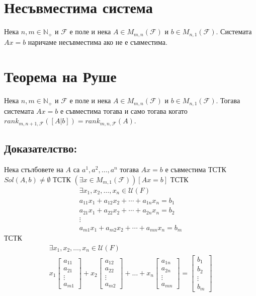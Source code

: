 \documentclass[a4paper,9pt]{extarticle}
\newcommand{\Nat}{\mathbb{N}}
\newcommand{\F}{\mathcal{F}}
\newcommand{\Uni}{\mathcal{U}}
\begin{document}
\section{Несъвместима система}
Нека \(n, m \in \Nat_+\) и \(\F\) е поле и нека \(A \in M_{m, n}(\F)\) и \(b \in M_{n, 1}(\F)\).
Системата \(Ax = b\) наричаме несъвместима ако не е съвместима.

\section{Теорема на Руше}
Нека \(n, m \in \Nat_+\) и \(\F\) е поле и нека \(A \in M_{m, n}(\F)\) и \(b \in M_{n, 1}(\F)\).
Тогава системата \(Ax = b\) е съвместима тогава и само тогава когато \(rank_{m, n + 1, \F}([A | b]) = rank_{m, n, \F}(A)\).

\subsection{Доказателство:}
Нека стълбовете на \(A\) са \(a^1, a^2, \dots, a^n\) тогава
\(Ax = b\) е съвместима ТСТК \(Sol(A, b) \neq \emptyset\) ТСТК \((\exists x \in M_{m, 1}(\F))[Ax = b]\) ТСТК
\begin{align*}
    \exists x_1, x_2, \dots, x_n \in \Uni(F) \\
    a_{11} x_1 + a_{12} x_2 + \cdots + a_{1n} x_n = b_1 \\
    a_{21} x_1 + a_{22} x_2 + \cdots + a_{2n} x_n = b_2 \\
    \vdots \\
    a_{m1} x_1 + a_{m2} x_2 + \cdots + a_{mn} x_n = b_m
\end{align*}
ТСТК
\begin{align*}
    \exists x_1, x_2, \dots, x_n \in \Uni(F) \\
    x_1 \begin{bmatrix}
        a_{11} \\
        a_{21} \\
        \vdots \\
        a_{m1}
    \end{bmatrix}
    + x_2 \begin{bmatrix}
        a_{12} \\
        a_{22} \\
        \vdots \\
        a_{m2}
    \end{bmatrix}
    + \dots
    + x_n \begin{bmatrix}
        a_{1n} \\
        a_{2n} \\
        \vdots \\
        a_{mn}
    \end{bmatrix}
    = \begin{bmatrix}
        b_1 \\
        b_2 \\
        \vdots \\
        b_m
    \end{bmatrix}
\end{align*}
\end{document}
